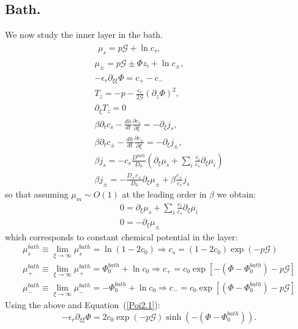 \documentclass[12pt]{extarticle}
\begin{document}
\subsection{Bath.}
We now study the inner layer  in the bath.
\begin{gather}
\begin{aligned}
\mu_s = p \mathcal{G} + \ln c_s, 
\end{aligned}\\[2.5mm]
\mu_\pm = p \mathcal{G} \pm \Phi z_i + \ln c_\pm ,\\
-\epsilon_r\partial_{\xi\xi} \Phi = c_+-c_-\, \label{Poi2.1}\\
T_z= -p-\frac{\epsilon_r }{2\mathcal{G}} (\partial_z \Phi)^2,\\
\partial_\xi T_z=0\\
\beta \partial_t c_s -\frac{dh}{dt}\frac{\partial c_s}{\partial \xi}= - \partial_\xi j_s,\\
\beta \partial_t c_\pm -\frac{dh}{dt}\frac{\partial c_\pm}{\partial \xi}= -\partial_\xi j_\pm,\\
\beta j_s =-c_s \frac{D^{bath}}{D_0}  \left(\partial_\xi\mu_s +\sum_i \frac{c_i}{c_s} \partial_\xi \mu_i\right)\\
\beta j_\pm= - \frac{D_\pm c_\pm}{D_0}\partial_\xi \mu_\pm + \beta \frac{c_\pm}{c_s}j_s
\end{gather}
so that assuming $\mu_m\sim O(1)$ at the leading order in $\beta$ we obtain:
\begin{gather}
0=\partial_\xi\mu_s +\sum_i \frac{c_i}{c_s} \partial_\xi \mu_i\\
0= - \partial_\xi \mu_\pm 
\end{gather}
which corresponds to constant chemical potential in the layer:
\begin{gather}
\mu^{bath}_s\equiv \lim_{\xi\rightarrow \infty}\mu^{bath}_s= \ln (1-2c_0) \Rightarrow c_s = (1-2c_0)\exp(-p\mathcal{G})\\
\mu^{bath}_+\equiv \lim_{\xi\rightarrow \infty}\mu^{bath}_+= \Phi_0^{bath}+\ln c_0 \Rightarrow c_+ = c_0\exp[-(\Phi-\Phi_0^{bath})-p\mathcal{G}]\\
\mu^{bath}_-\equiv \lim_{\xi\rightarrow \infty}\mu^{bath}_-= -\Phi_0^{bath}+\ln c_0\Rightarrow c_- = c_0\exp[(\Phi-\Phi_0^{bath})-p\mathcal{G}]
\end{gather}
Using the above and Equation~(\ref{Poi2.1}):
\begin{equation}
-\epsilon_r\partial_{\xi\xi} \Phi = 2c_0\exp(-p\mathcal{G}) \sinh(-(\Phi-\Phi_0^{bath})).
\end{equation}
\end{document}
